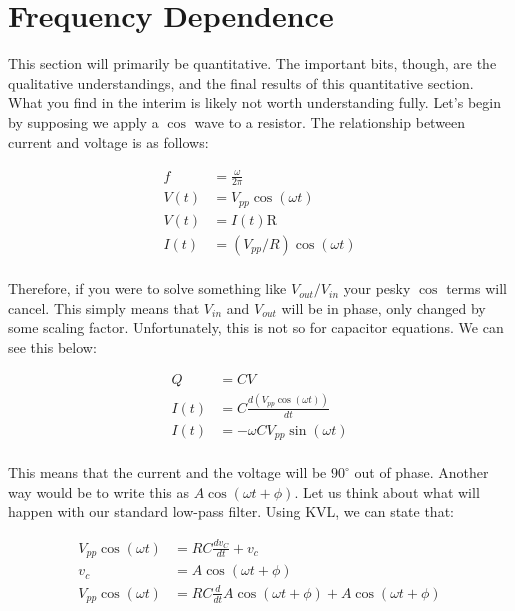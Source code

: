 \documentclass[12pt]{report}
\newcommand{\pr}[1]{\left(#1\right)}
\newcommand{\Vpp}{{ V}_{ pp}}
\newcommand{\Vo}{{V}_{out}}
\newcommand{\Vi}{{V}_{in}}
\begin{document}
\section{Frequency Dependence}
This section will primarily be quantitative. The important bits, though, are the qualitative understandings, and the final results of this quantitative section. What you find in the interim is likely not worth understanding fully. Let's begin by supposing we apply a $\cos$ wave to a resistor. The relationship between current and voltage is as follows:

\begin{equation} \label{freq1}
\begin{split}
f &= \frac{\omega}{2\pi}\\
V(t) &= \Vpp \cos\pr{\omega t} \\
V(t) &= I(t)\mathrm{R} \\
I(t) & = \pr{\Vpp / {R}} \cos\pr{\omega t}\\
\end{split}
\end{equation}\newline

Therefore, if you were to solve something like $\Vo / \Vi$ your pesky $\cos$ terms will cancel. This simply means that $\Vi$ and $\Vo$ will be in phase, only changed by some scaling factor. Unfortunately, this is not so for capacitor equations. We can see this below: 

\begin{equation} \label{freq2}
\begin{split}
Q &= CV \\
I(t) &= C \frac{d \pr{\Vpp \cos\pr{\omega t}}}{dt} \\
I(t) &= - \omega C \Vpp \sin \pr{\omega t} \\
\end{split}
\end{equation}\newline

This means that the current and the voltage will be $90^{\circ}$ out of phase. Another way would be to write this as $A \cos \pr{\omega t + \phi}$. Let us think about what will happen with our standard low-pass filter. Using KVL, we can state that: 

\begin{equation} \label{freq3}
\begin{split}
\Vpp \cos\pr{\omega t} &= RC\frac{dv_C}{dt} + v_c \\ 
v_c &= A \cos \pr{\omega t + \phi} \\ 
\Vpp \cos\pr{\omega t} &= RC\frac{d}{dt}A \cos \pr{\omega t + \phi} + A \cos \pr{\omega t + \phi} \\
\end{split}
\end{equation}
\end{document}
